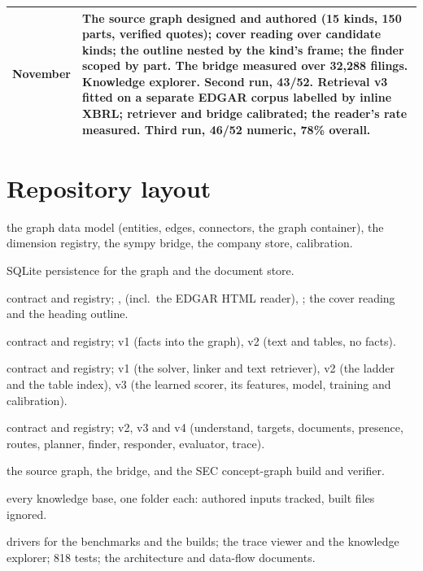 \begin{table}[h]
\begin{tabular}{p{18mm}p{132mm}}
November & The source graph designed and authored (15 kinds, 150 parts, verified quotes); cover reading over candidate kinds; the outline nested by the kind's frame; the finder scoped by part. The bridge measured over 32,288 filings. Knowledge explorer. Second run, 43/52. Retrieval v3 fitted on a separate EDGAR corpus labelled by inline XBRL; retriever and bridge calibrated; the reader's rate measured. Third run, 46/52 numeric, 78\% overall. \\
\bottomrule
\end{tabular}
\end{table}

\section{Repository layout}
\label{app:layout}

\begin{description}\small
\item[\code{models/}] the graph data model (entities, edges, connectors, the graph container), the dimension registry, the sympy bridge, the company store, calibration.
\item[\code{store.py}] SQLite persistence for the graph and the document store.
\item[\code{document\_adapters/}] contract and registry; ,  (incl.\ the EDGAR HTML reader), ; the cover reading and the heading outline.
\item[\code{ingestion/}] contract and registry; v1 (facts into the graph), v2 (text and tables, no facts).
\item[\code{retrieval/}] contract and registry; v1 (the solver, linker and text retriever), v2 (the ladder and the table index), v3 (the learned scorer, its features, model, training and calibration).
\item[\code{agent\_loops/}] contract and registry; v2, v3 and v4 (understand, targets, documents, presence, routes, planner, finder, responder, evaluator, trace).
\item[\code{sources/}, \code{bridge/}, \code{secgraph/}] the source graph, the bridge, and the SEC concept-graph build and verifier.
\item[\code{knowledge/}] every knowledge base, one folder each: authored inputs tracked, built files ignored.
\item[\code{scripts/}, \code{viz/}, \code{tests/}, \code{docs/}] drivers for the benchmarks and the builds; the trace viewer and the knowledge explorer; 818 tests; the architecture and data-flow documents.
\end{description}
